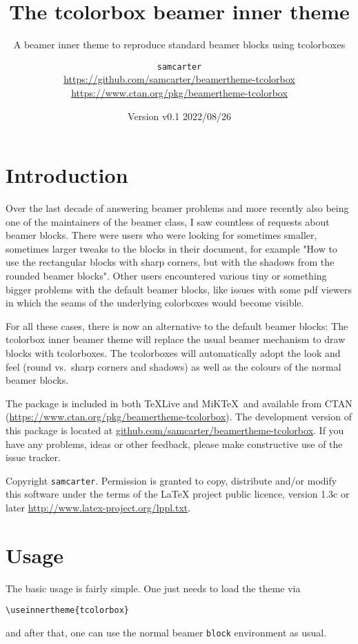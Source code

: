 \documentclass[parskip=half]{scrartcl}
\title{The tcolorbox beamer inner theme}
\subtitle{A beamer inner theme to reproduce standard beamer blocks using tcolorboxes}
\author{%
	\texorpdfstring{
		\texttt{samcarter}\\
		\url{https://github.com/samcarter/beamertheme-tcolorbox}\\
		\url{https://www.ctan.org/pkg/beamertheme-tcolorbox}
	}{samcarter}}
\date{Version v0.1 \textendash{} 2022/08/26}
\begin{document}
\maketitle

\section{Introduction}
\label{intro}

Over the last decade of answering beamer problems and more recently also being one of the maintainers of the beamer class, I saw countless of requests about beamer blocks. There were users who were looking for sometimes smaller, sometimes larger tweaks to the blocks in their document, for example "How to use the rectangular blocks with sharp corners, but with the shadows from the rounded beamer blocks". Other users encountered various tiny or something bigger problems with the default beamer blocks, like issues with some pdf viewers in which the seams of the underlying colorboxes would become visible. 

For all these cases, there is now an alternative to the default beamer blocks: The tcolorbox inner beamer theme will replace the usual beamer mechanism to draw blocks with tcolorboxes. The tcolorboxes will automatically adopt the look and feel (round vs.\ sharp corners and shadows) as well as the colours of the normal beamer blocks.

The package is included in both \TeX{}Live and MiK\TeX\ and available from \textsc{CTAN} (\url{https://www.ctan.org/pkg/beamertheme-tcolorbox}). 
The development version of this package is located at \url{github.com/samcarter/beamertheme-tcolorbox}. If you have any problems, ideas or other feedback, please make constructive use of the issue tracker.

Copyright  \texttt{samcarter}. Permission is granted to copy, distribute and\slash or modify this software under the terms of the LaTeX project public licence, version 1.3c or later \url{http://www.latex-project.org/lppl.txt}.

\section{Usage}

The basic usage is fairly simple. One just needs to load the theme via 
\begin{tcolorbox}
\begin{lstlisting}
\useinnertheme{tcolorbox}
\end{lstlisting}
\end{tcolorbox}
and after that, one can use the normal beamer \lstinline|block| environment as usual. 
\end{document}
